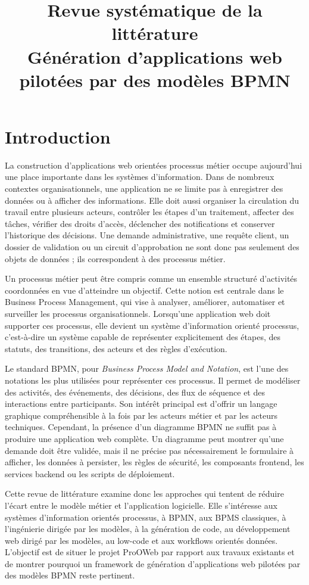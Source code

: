 \documentclass[12pt,a4paper]{article}
\title{Revue systématique de la littérature\\
\large Génération d'applications web pilotées par des modèles BPMN}
\author{}
\date{}
\begin{document}
\maketitle

\section{Introduction}

La construction d'applications web orientées processus métier occupe aujourd'hui une place importante dans les systèmes d'information. Dans de nombreux contextes organisationnels, une application ne se limite pas à enregistrer des données ou à afficher des informations. Elle doit aussi organiser la circulation du travail entre plusieurs acteurs, contrôler les étapes d'un traitement, affecter des tâches, vérifier des droits d'accès, déclencher des notifications et conserver l'historique des décisions. Une demande administrative, une requête client, un dossier de validation ou un circuit d'approbation ne sont donc pas seulement des objets de données ; ils correspondent à des processus métier.

Un processus métier peut être compris comme un ensemble structuré d'activités coordonnées en vue d'atteindre un objectif. Cette notion est centrale dans le Business Process Management, qui vise à analyser, améliorer, automatiser et surveiller les processus organisationnels. Lorsqu'une application web doit supporter ces processus, elle devient un système d'information orienté processus, c'est-à-dire un système capable de représenter explicitement des étapes, des statuts, des transitions, des acteurs et des règles d'exécution.

Le standard BPMN, pour \textit{Business Process Model and Notation}, est l'une des notations les plus utilisées pour représenter ces processus. Il permet de modéliser des activités, des événements, des décisions, des flux de séquence et des interactions entre participants. Son intérêt principal est d'offrir un langage graphique compréhensible à la fois par les acteurs métier et par les acteurs techniques. Cependant, la présence d'un diagramme BPMN ne suffit pas à produire une application web complète. Un diagramme peut montrer qu'une demande doit être validée, mais il ne précise pas nécessairement le formulaire à afficher, les données à persister, les règles de sécurité, les composants frontend, les services backend ou les scripts de déploiement.

Cette revue de littérature examine donc les approches qui tentent de réduire l'écart entre le modèle métier et l'application logicielle. Elle s'intéresse aux systèmes d'information orientés processus, à BPMN, aux BPMS classiques, à l'ingénierie dirigée par les modèles, à la génération de code, au développement web dirigé par les modèles, au low-code et aux workflows orientés données. L'objectif est de situer le projet ProOWeb par rapport aux travaux existants et de montrer pourquoi un framework de génération d'applications web pilotées par des modèles BPMN reste pertinent.
\end{document}
